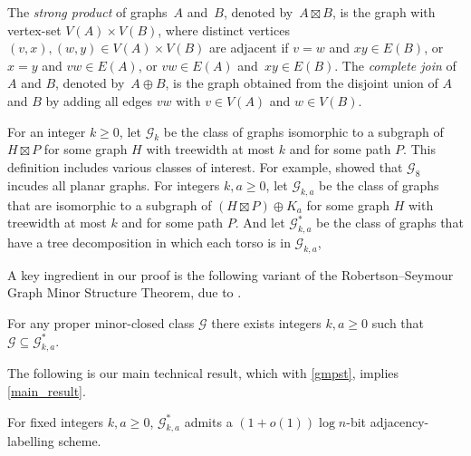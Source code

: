 \documentclass{patmorin}
\renewcommand{\geq}{\geqslant}
\newcommand{\david}[1]{{\color{orange} DW: #1}}
\newcommand{\defin}[1]{\emph{\textcolor{brightmaroon}{#1}}}
\begin{document}
The \defin{strong product} of graphs~$A$ and~$B$, denoted by~${A \boxtimes B}$, is the graph with vertex-set ${V(A) \times V(B)}$, where distinct vertices ${(v,x),(w,y) \in V(A) \times V(B)}$ are adjacent if
	${v=w}$ and ${xy \in E(B)}$, or
	${x=y}$ and ${vw \in E(A)}$, or
	${vw \in E(A)}$ and~${xy \in E(B)}$. The \defin{complete join} of $A$ and $B$, denoted by~${A\oplus B}$, is the graph obtained from the disjoint union of $A$ and $B$ by adding all edges $vw$ with $v\in V(A)$ and $w\in V(B)$.

For an integer $k\geq 0$, let \defin{$\mathcal{G}_{k}$} be the class of graphs isomorphic to a subgraph of $H\boxtimes P$ for some graph $H$ with treewidth at most $k$ and for some path $P$. This definition includes various classes of interest. For example, \citet{dujmovic.joret.ea:planar} showed that
$\mathcal{G}_{8}$ incudes all planar graphs. For integers $k,a\geq 0$, let \defin{$\mathcal{G}_{k,a}$} be the class of graphs that are isomorphic to a subgraph of $(H\boxtimes P)\oplus K_a$ for some graph $H$ with treewidth at most $k$ and for some path $P$. And let \defin{$\mathcal{G}^*_{k,a}$} be the class of graphs that have a tree decomposition in which each torso is in $\mathcal{G}_{k,a}$,

A key ingredient in our proof is the following variant of the Robertson--Seymour Graph Minor Structure Theorem, due to \citet{dujmovic.joret.ea:planar}.

  \begin{thm}
  \label{gmpst}
  For any proper minor-closed class $\mathcal{G}$ there exists integers $k,a\geq 0$ such that $\mathcal{G} \subseteq \mathcal{G}^*_{k,a}$.
  \end{thm}

The following is our main technical result, which with  \cref{gmpst}, implies \cref{main_result}.

\begin{thm}
\label{MainTechnicalStatement}
For fixed integers $k,a\geq 0$, $\mathcal{G}^*_{k,a}$ admits a $(1+o(1))\log n$-bit adjacency-labelling scheme.
\end{thm}
\end{document}
